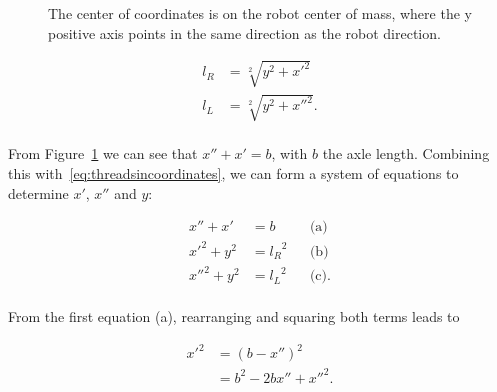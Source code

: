 \documentclass[journal]{IEEEtran}
\begin{document}
\begin{figure}[]

\caption{The center of coordinates is on the robot center of mass, where the y positive axis points in the same direction as the robot direction.}
\label{fig:dibujitos}
\end{figure}{}

\begin{equation}
\begin{array}{ll}  
l_R &= \sqrt[2]{y^2 + {x'}^2} \\
l_L &= \sqrt[2]{y^2 + {x''}^2}. \\
\end{array}
\label{eq:threadsincoordinates}
\end{equation}

From Figure~\ref{fig:dibujitos} we can see that ${x''} + x' =  b$, with $b$ the axle length. Combining this with~\ref{eq:threadsincoordinates}, we can form a system of equations to determine $x'$, $x''$ and $y$:

\begin{align*}
{x''} + x'					&=  b &&\text{(a)}  \\
{x'}^2 +  y^2                &= {l_R}^2 &&\text{(b)} \\
{x''}^2 + y^2                &= {l_L}^2  &&\text{(c)}. \\
\end{align*}

From the first equation (a), rearranging and squaring both terms leads to

\begin{equation}
\begin{array}{ll}  
{x'}^2   	&=  ( b - x'')^2   \\
 						&= b^2 - 2 b x''+ {x''}^2. \\
\end{array}
\label{eq:thirdstep}
\end{equation}
\end{document}
